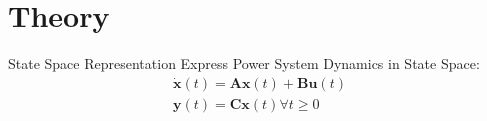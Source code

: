 \section[Theory]{Theory}
\label{sec:lasso_theory}

\begin{frame}[fragile]{State Space Representation}
	Express Power System Dynamics in State Space:
	\begin{equation}
		\label{eq:ssr}
		\begin{align}
			\dot{\textbf{x}}(t) = 
			\textbf{A}\textbf{x}(t)
			+ \textbf{B}\textbf{u}(t)\\
			\textbf{y}(t) = 
			\textbf{C}\textbf{x}(t)  
			\forall t\geq0
		\end{align}
	\end{equation}
\end{frame}